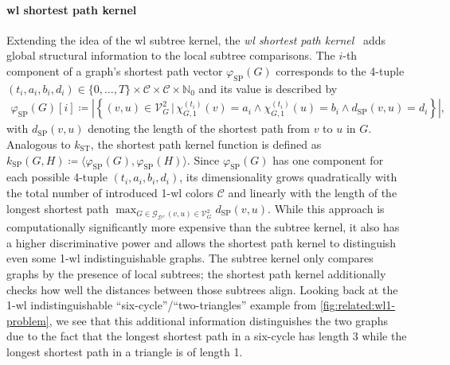 \paragraph{\ac{wl} shortest path kernel}
Extending the idea of the \ac{wl} subtree kernel, the \textit{\ac{wl} shortest path kernel}~\cite{Shervashidze2011}\cite{Borgwardt2005} adds global structural information to the local subtree comparisons.
The $i$-th component of a graph's shortest path vector $\varphi_{\text{SP}}(G)$ corresponds to the 4-tuple $(t_i, a_i, b_i, d_i) \in {\{ 0, \dots, T \}} \times \mathcal{C} \times \mathcal{C} \times \mathbb{N}_0$ and its value is described by
\begin{align}
	{\varphi_{\text{SP}}(G)}[i] \coloneqq \left| \left\{ (v, u) \in \mathcal{V}_G^2 \,|\, {\chi_{G,1}^{(t_i)}(v) = a_i} \land {\chi_{G,1}^{(t_i)}(u) = b_i} \land {d_{\text{SP}}(v, u) = d_i} \right\} \right| \text{,} %
\end{align}
with $d_{\text{SP}}(v, u)$ denoting the length of the shortest path from $v$ to $u$ in $G$.
Analogous to $k_{\text{ST}}$, the shortest path kernel function is defined as $k_{\text{SP}}(G, H) \coloneqq \langle \varphi_{\text{SP}}(G), \varphi_{\text{SP}}(H) \rangle$.
Since $\varphi_{\text{SP}}(G)$ has one component for each possible 4-tuple $(t_i, a_i, b_i, d_i)$, its dimensionality grows quadratically with the total number of introduced 1-\acs{wl} colors $\mathcal{C}$ and linearly with the length of the longest shortest path $\max_{G \in \mathcal{G}_{\mathcal{D}}, (v, u) \in \mathcal{V}_G^2} d_{\text{SP}}(v, u)$.
While this approach is computationally significantly more expensive than the subtree kernel, it also has a higher discriminative power and allows the shortest path kernel to distinguish even some 1-\acs{wl} indistinguishable graphs.
The subtree kernel only compares graphs by the presence of local subtrees;
the shortest path kernel additionally checks how well the distances between those subtrees align.
Looking back at the 1-\acs{wl} indistinguishable ``six-cycle''/``two-triangles'' example from \cref{fig:related:wl1-problem}, we see that this additional information distinguishes the two graphs due to the fact that the longest shortest path in a six-cycle has length 3 while the longest shortest path in a triangle is of length 1.

